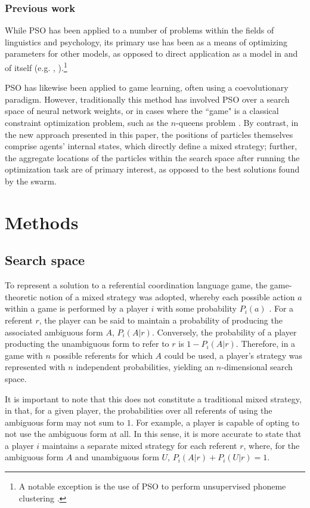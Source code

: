 \documentclass[a4paper,11pt]{article}
\begin{document}
\subsubsection{Previous work}
\label{sec:pso_prev_work}

While PSO has been applied to a number of problems within the fields of linguistics and psychology, its primary use has been as a means of optimizing parameters for other models, as opposed to direct application as a model in and of itself (e.g. \citeauthor{mehdad2009}, ).\footnote{A notable exception is the use of PSO to perform unsupervised phoneme clustering \cite{ahmadi2007}.}

PSO has likewise been applied to game learning, often using a coevolutionary paradigm. However, traditionally this method has involved PSO over a search space of neural network weights, or in cases where the ``game" is a classical constraint optimization problem, such as the $n$-queens problem \cite{engelbrecht2005}. By contrast, in the new approach presented in this paper, the positions of particles themselves comprise agents' internal states, which directly define a mixed strategy; further, the aggregate locations of the particles within the search space after running the optimization task are of primary interest, as opposed to the best solutions found by the swarm.


\section{Methods}
\subsection{Search space}
\label{sec:search_space}
To represent a solution to a referential coordination language game, the game-theoretic notion of a mixed strategy was adopted, whereby each possible action $a$ within a game is performed by a player $i$ with some probability $P_i(a)$ \cite{benz2005}. For a referent $r$, the player can be said to maintain a probability of producing the associated ambiguous form $A$, $P_i(A|r)$. Conversely, the probability of a player producting the unambiguous form to refer to $r$ is $1 - P_i(A|r)$. Therefore, in a game with $n$ possible referents for which $A$ could be used, a player's strategy was represented with $n$ independent probabilities, yielding an $n$-dimensional search space. 

It is important to note that this does not constitute a traditional mixed strategy, in that, for a given player, the probabilities over all referents of using the ambiguous form may not sum to $1$.  For example, a player is capable of opting to not use the ambiguous form at all. In this sense, it is more accurate to state that a player $i$ maintains a separate mixed strategy for each referent $r$, where, for the ambiguous form $A$ and unambiguous form $U$, $P_i(A|r) + P_i(U|r) = 1$.
\end{document}

